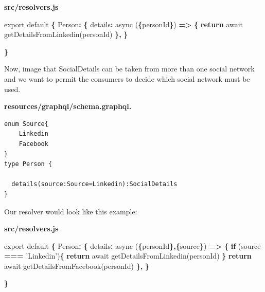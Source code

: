 \documentclass[]{book}
\newenvironment{Shaded}{\begin{snugshade}}{\end{snugshade}}
\newcommand{\DataTypeTok}[1]{\textcolor[rgb]{0.13,0.29,0.53}{#1}}
\newcommand{\StringTok}[1]{\textcolor[rgb]{0.31,0.60,0.02}{#1}}
\newcommand{\ImportTok}[1]{#1}
\newcommand{\ControlFlowTok}[1]{\textcolor[rgb]{0.13,0.29,0.53}{\textbf{#1}}}
\newcommand{\OperatorTok}[1]{\textcolor[rgb]{0.81,0.36,0.00}{\textbf{#1}}}
\newcommand{\AttributeTok}[1]{\textcolor[rgb]{0.77,0.63,0.00}{#1}}
\newcommand{\NormalTok}[1]{#1}
\begin{document}
\textbf{src/resolvers.js}

\begin{Shaded}
\begin{Highlighting}[]
\ImportTok{export} \ImportTok{default} \OperatorTok{\{}
    \DataTypeTok{Person}\OperatorTok{:} \OperatorTok{\{}
        \DataTypeTok{details}\OperatorTok{:} \AttributeTok{async}\NormalTok{ (}\OperatorTok{\{}\NormalTok{personId}\OperatorTok{\}}\NormalTok{) }\OperatorTok{=>} \OperatorTok{\{}
            \ControlFlowTok{return}\NormalTok{ await }\AttributeTok{getDetailsFromLinkedin}\NormalTok{(personId)}
        \OperatorTok{\},}
    \OperatorTok{\}}
    
\OperatorTok{\}}
\end{Highlighting}
\end{Shaded}

Now, image that SocialDetails can be taken from more than one social
network and we want to permit the consumers to decide which social
network must be used.

\textbf{resources/graphql/schema.graphql.}

\begin{verbatim}
enum Source{
    Linkedin
    Facebook
}
type Person {

  details(source:Source=Linkedin):SocialDetails
}
\end{verbatim}

Our resolver would look like this example:

\textbf{src/resolvers.js}

\begin{Shaded}
\begin{Highlighting}[]
\ImportTok{export} \ImportTok{default} \OperatorTok{\{}
    \DataTypeTok{Person}\OperatorTok{:} \OperatorTok{\{}
        \DataTypeTok{details}\OperatorTok{:} \AttributeTok{async}\NormalTok{ (}\OperatorTok{\{}\NormalTok{personId}\OperatorTok{\},\{}\NormalTok{source}\OperatorTok{\}}\NormalTok{) }\OperatorTok{=>} \OperatorTok{\{}
            \ControlFlowTok{if}\NormalTok{ (source }\OperatorTok{===} \StringTok{'Linkedin'}\NormalTok{)}\OperatorTok{\{}
                \ControlFlowTok{return}\NormalTok{ await }\AttributeTok{getDetailsFromLinkedin}\NormalTok{(personId)    }
            \OperatorTok{\}}
            \ControlFlowTok{return}\NormalTok{ await }\AttributeTok{getDetailsFromFacebook}\NormalTok{(personId)}
        \OperatorTok{\},}
    \OperatorTok{\}}
    
\OperatorTok{\}}
\end{Highlighting}
\end{Shaded}
\end{document}
